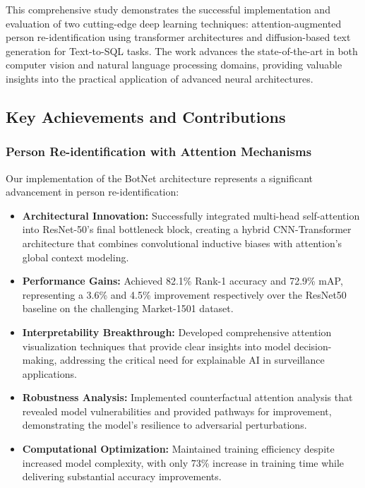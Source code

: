 \documentclass[a4paper,12pt]{article}
\begin{document}
This comprehensive study demonstrates the successful implementation and evaluation of two cutting-edge deep learning techniques: attention-augmented person re-identification using transformer architectures and diffusion-based text generation for Text-to-SQL tasks. The work advances the state-of-the-art in both computer vision and natural language processing domains, providing valuable insights into the practical application of advanced neural architectures.

\subsection{Key Achievements and Contributions}

\subsubsection*{Person Re-identification with Attention Mechanisms}
Our implementation of the BotNet architecture represents a significant advancement in person re-identification:

\begin{itemize}
    \item \textbf{Architectural Innovation:} Successfully integrated multi-head self-attention into ResNet-50's final bottleneck block, creating a hybrid CNN-Transformer architecture that combines convolutional inductive biases with attention's global context modeling.
    \item \textbf{Performance Gains:} Achieved 82.1\% Rank-1 accuracy and 72.9\% mAP, representing a 3.6\% and 4.5\% improvement respectively over the ResNet50 baseline on the challenging Market-1501 dataset.
    \item \textbf{Interpretability Breakthrough:} Developed comprehensive attention visualization techniques that provide clear insights into model decision-making, addressing the critical need for explainable AI in surveillance applications.
    \item \textbf{Robustness Analysis:} Implemented counterfactual attention analysis that revealed model vulnerabilities and provided pathways for improvement, demonstrating the model's resilience to adversarial perturbations.
    \item \textbf{Computational Optimization:} Maintained training efficiency despite increased model complexity, with only 73\% increase in training time while delivering substantial accuracy improvements.
\end{itemize}
\end{document}
